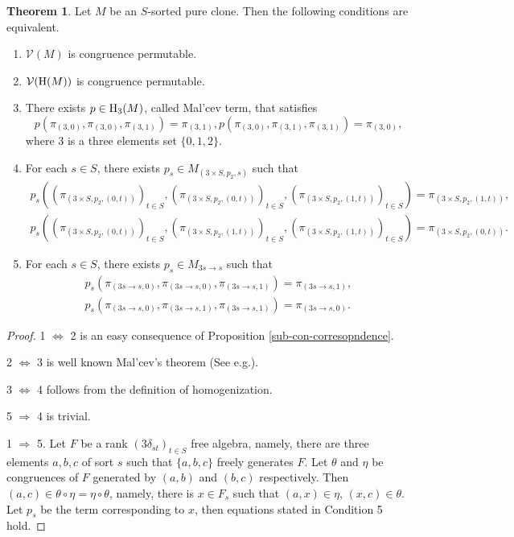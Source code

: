 \documentclass[a4paper,10pt]{article}
\theoremstyle{definition}
\newtheorem{thm}[df]{Theorem}
\newcommand\ra{\rightarrow}
\newcommand\V{\mathcal{V}}
\begin{document}
\begin{thm}\label{malcev}
Let $M$ be an $S$-sorted pure clone.
Then the following conditions are equivalent.
\begin{enumerate}
\item
$\V(M)$ is congruence permutable.
\item
$\V({\rm H}(M))$ is congruence permutable.
\item
There exists $p\in {\rm H}_3(M)$, called Mal'cev term, that satisfies
\[
p(\pi_{(3,0)},\pi_{(3,0)},\pi_{(3,1)})=\pi_{(3,1)}
,p(\pi_{(3,0)},\pi_{(3,1)},\pi_{(3,1)})=\pi_{(3,0)},
\]
where $3$ is a three elements set $\{0,1,2\}$.
\item
For each $s\in S$, there exists $p_s\in M_{(3\times S,p_2,s)}$ such that
\begin{align*}
p_s((\pi_{(3\times S,p_2,(0,t))})_{t\in S},(\pi_{(3\times S,p_2,(0,t))})_{t\in S},(\pi_{(3\times S,p_2,(1,t))})_{t\in S})
=\pi_{(3\times S,p_2,(1,t))},\\
p_s((\pi_{(3\times S,p_2,(0,t))})_{t\in S},(\pi_{(3\times S,p_2,(1,t))})_{t\in S},(\pi_{(3\times S,p_2,(1,t))})_{t\in S})
=\pi_{(3\times S,p_2,(0,t))}.
\end{align*}
\item
For each $s\in S$, there exists $p_s\in M_{3s\ra s}$ such that
\begin{align*}
p_s(\pi_{(3s\ra s,0)},\pi_{(3s\ra s,0)},\pi_{(3s\ra s,1)})
=\pi_{(3s\ra s,1)},\\
p_s(\pi_{(3s\ra s,0)},\pi_{(3s\ra s,1)},\pi_{(3s\ra s,1)})
=\pi_{(3s\ra s,0)}.
\end{align*}
\end{enumerate}
\end{thm}
\begin{proof}
1 $\Leftrightarrow$ 2 is an easy consequence of Proposition \ref{sub-con-corresopndence}.

2 $\Leftrightarrow$ 3 is well known Mal'cev's theorem (See e.g.{\cite[Theorem 12.2]{BS}}).

3 $\Leftrightarrow$ 4 follows from the definition of homogenization.

5 $\Rightarrow$ 4 is trivial.

1 $\Rightarrow$ 5. Let $F$ be a rank $(3\delta_{st})_{t\in S}$ free algebra,
namely, there are three elements $a,b,c$ of sort $s$ such that $\{a,b,c\}$ freely
generates $F$. Let $\theta$ and $\eta$ be congruences of $F$ generated by
$(a,b)$ and $(b,c)$ respectively. Then $(a,c)\in\theta\circ\eta=\eta\circ\theta$,
namely, there is $x\in F_s$ such that $(a,x)\in \eta$, $(x,c)\in\theta$.
Let $p_s$ be the term corresponding to $x$, then equations stated in Condition 5 hold.
\end{proof}
\end{document}
